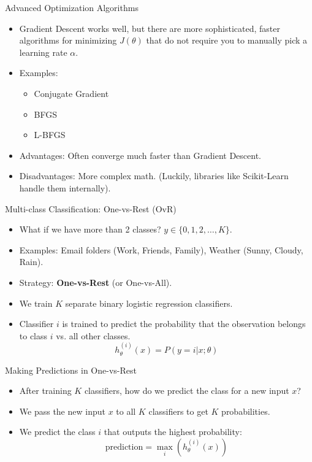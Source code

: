 \documentclass[aspectratio=169]{beamer}
\begin{document}
\begin{frame}{Advanced Optimization Algorithms}
\begin{itemize}
    \item Gradient Descent works well, but there are more sophisticated, faster algorithms for minimizing $J(\theta)$ that do not require you to manually pick a learning rate $\alpha$.
    \item Examples:
        \begin{itemize}
            \item Conjugate Gradient
            \item BFGS
            \item L-BFGS
        \end{itemize}
    \item Advantages: Often converge much faster than Gradient Descent.
    \item Disadvantages: More complex math. (Luckily, libraries like Scikit-Learn handle them internally).
\end{itemize}
\end{frame}

\begin{frame}{Multi-class Classification: One-vs-Rest (OvR)}
\begin{itemize}
    \item What if we have more than 2 classes? $y \in \{0, 1, 2, \dots, K\}$.
    \item Examples: Email folders (Work, Friends, Family), Weather (Sunny, Cloudy, Rain).
    \item Strategy: \textbf{One-vs-Rest} (or One-vs-All).
    \item We train $K$ separate binary logistic regression classifiers.
    \item Classifier $i$ is trained to predict the probability that the observation belongs to class $i$ vs. all other classes.
    $$ h_\theta^{(i)}(x) = P(y=i | x; \theta) $$
\end{itemize}
\end{frame}

\begin{frame}{Making Predictions in One-vs-Rest}
\begin{itemize}
    \item After training $K$ classifiers, how do we predict the class for a new input $x$?
    \item We pass the new input $x$ to all $K$ classifiers to get $K$ probabilities.
    \item We predict the class $i$ that outputs the highest probability:
    $$ \text{prediction} = \max_i \left( h_\theta^{(i)}(x) \right) $$
\end{itemize}
\end{frame}
\end{document}
